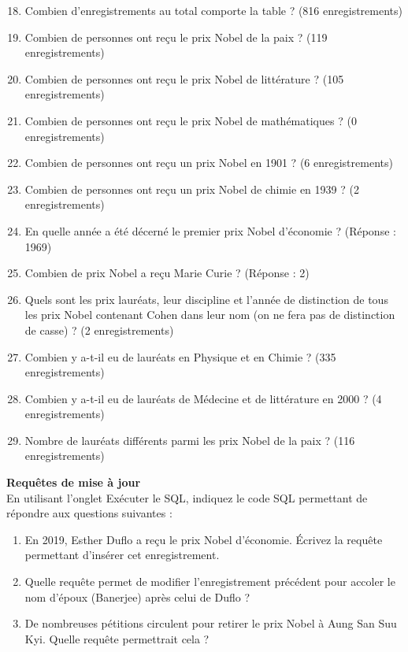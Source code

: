 \documentclass[10pt,cours,a4paper,firamath]{nsi}
\begin{document}
\begin{exercice}
    \begin{enumerate}
        \setcounter{enumi}{17}
        \item  Combien d'enregistrements au total comporte la table ? (816 enregistrements)
        \item  Combien de personnes ont reçu le prix Nobel de la paix ? (119 enregistrements)
        \item  Combien de personnes ont reçu le prix Nobel de littérature ? (105 enregistrements)
        \item  Combien de personnes ont reçu le prix Nobel de mathématiques ? (0 enregistrements)
        \item  Combien de personnes ont reçu un prix Nobel en 1901 ? (6 enregistrements)
        \item  Combien de personnes ont reçu un prix Nobel de chimie en 1939 ? (2 enregistrements)
        \item  En quelle année a été décerné le premier prix Nobel d'économie ? (Réponse : 1969)
        \item  Combien de prix Nobel a reçu Marie Curie ? (Réponse : 2)
        \item  Quels sont les prix lauréats, leur discipline et l'année de distinction de tous les prix Nobel contenant Cohen dans leur nom (on ne fera pas de distinction de casse) ? (2 enregistrements)
        \item  Combien y a-t-il eu de lauréats en Physique et en Chimie ? (335 enregistrements)
        \item  Combien y a-t-il eu de lauréats de Médecine et de littérature en 2000 ? (4 enregistrements)
        \item  Nombre de lauréats différents parmi les prix Nobel de la paix ? (116 enregistrements)\\
    \end{enumerate}
    
    \textbf{Requêtes de mise à jour}\\
    \setcounter{enumi}{29}
    En utilisant l'onglet Exécuter le SQL, indiquez le code SQL permettant de répondre aux questions suivantes :\\
    
    \begin{enumerate}
        \item En 2019, Esther Duflo a reçu le prix Nobel d'économie. Écrivez la requête permettant d'insérer cet enregistrement.
        \item  Quelle requête permet de modifier l'enregistrement précédent pour accoler le nom d'époux (Banerjee) après celui de Duflo ?
        \item   De nombreuses pétitions circulent pour retirer le prix Nobel à Aung San Suu Kyi. Quelle requête permettrait cela ?
    \end{enumerate}
\end{exercice}
\end{document}
